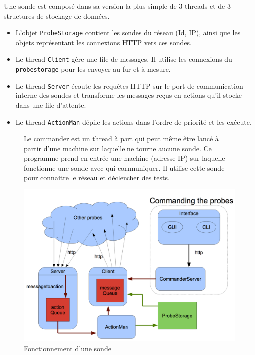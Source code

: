 \documentclass[a4paper,11pt]{article}
\newcommand{\cd}[1]{\texttt{#1}}
\begin{document}
Une sonde est composé dans sa version la plus simple de 3 threads et de 3 structures de stockage de données.
\begin{itemize}
\item L'objet \cd{ProbeStorage} contient les sondes du réseau (Id, IP), ainsi que les objets représentant les connexions HTTP vers ces sondes.
\item Le thread \cd{Client} gère une file de messages. Il utilise les connexions du \cd{probestorage} pour les envoyer au fur et à mesure.
\item Le thread \cd{Server} écoute les requêtes HTTP sur le port de communication interne des sondes et transforme les messages reçus en actions qu'il stocke dans une file d'attente.
\item Le thread \cd{ActionMan} dépile les actions dans l'ordre de priorité et les exécute.
\end{itemize}
\begin{figure}[!ht]
\begin{minipage}[c]{0.3\linewidth}

Le commander est un thread à part qui peut même être lancé à partir d'une machine sur laquelle ne tourne aucune sonde. Ce programme prend en entrée une machine (adresse IP) sur laquelle fonctionne une sonde avec qui communiquer. Il utilise cette sonde pour connaitre le réseau et déclencher des tests.
\end{minipage}
\hfill
\begin{minipage}[c]{0.65\linewidth}

\centering\includegraphics[width=\linewidth]{img/graphCommander.png}
\caption{Fonctionnement d'une sonde}
\end{minipage}
\end{figure}
\FloatBarrier
\end{document}
